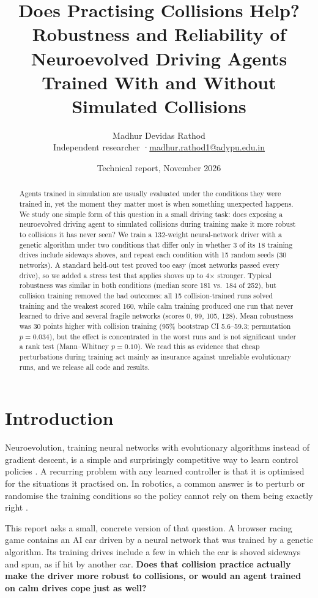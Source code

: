 \documentclass[11pt,a4paper]{article}
\title{\Large\bfseries Does Practising Collisions Help?\\ Robustness and Reliability of Neuroevolved Driving Agents\\ Trained With and Without Simulated Collisions}
\author{Madhur Devidas Rathod\\ \small Independent researcher \quad·\quad \href{mailto:madhur.rathod1@adypu.edu.in}{madhur.rathod1@adypu.edu.in}}
\date{\small Technical report, November 2026}
\begin{document}
\maketitle

\begin{abstract}
\noindent
Agents trained in simulation are usually evaluated under the conditions they were trained in, yet the moment they matter most is when something unexpected happens. We study one simple form of this question in a small driving task: does exposing a neuroevolved driving agent to simulated collisions during training make it more robust to collisions it has never seen? We train a 132-weight neural-network driver with a genetic algorithm under two conditions that differ only in whether 3 of its 18 training drives include sideways shoves, and repeat each condition with 15 random seeds (30 networks). A standard held-out test proved too easy (most networks passed every drive), so we added a stress test that applies shoves up to 4$\times$ stronger. Typical robustness was similar in both conditions (median score 181 vs.\ 184 of 252), but collision training removed the bad outcomes: all 15 collision-trained runs solved training and the weakest scored 160, while calm training produced one run that never learned to drive and several fragile networks (scores 0, 99, 105, 128). Mean robustness was 30 points higher with collision training (95\% bootstrap CI 5.6--59.3; permutation $p=0.034$), but the effect is concentrated in the worst runs and is not significant under a rank test (Mann--Whitney $p=0.10$). We read this as evidence that cheap perturbations during training act mainly as insurance against unreliable evolutionary runs, and we release all code and results.
\end{abstract}

\section{Introduction}
Neuroevolution, training neural networks with evolutionary algorithms instead of gradient descent, is a simple and surprisingly competitive way to learn control policies \cite{stanley2002neat,floreano2008,such2017deep,salimans2017es}. A recurring problem with any learned controller is that it is optimised for the situations it practised on. In robotics, a common answer is to perturb or randomise the training conditions so the policy cannot rely on them being exactly right \cite{tobin2017dr,pinto2017rarl}.

This report asks a small, concrete version of that question. A browser racing game contains an AI car driven by a neural network that was trained by a genetic algorithm. Its training drives include a few in which the car is shoved sideways and spun, as if hit by another car. \textbf{Does that collision practice actually make the driver more robust to collisions, or would an agent trained on calm drives cope just as well?}
\end{document}
